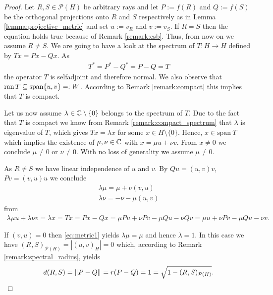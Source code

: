 \begin{proof}
	Let $R,S \in\mathcal{P}(H)$ be arbitrary rays and let $P := f(R)$ and $Q:= f(S)$ be the orthogonal projections onto $R$ and $S$ respectively as in Lemma \ref{lemma:projective_metric} and set $u := v_R$ and $v := v_S$. If $R = S$ then the equation holds true because of Remark \ref{remark:csb}. Thus, from now on we assume $R \neq S$. We are going to have a look at the spectrum of $T: H \to H$ defined by $Tx = Px - Qx$. As
	\begin{align*}
		T^\ast = P^\ast - Q^\ast = P - Q = T
	\end{align*}
	the operator $T$ is selfadjoint and therefore normal. We also observe that $\operatorname{ran} T \subseteq \mathrm{span}\{u, v\} =: W$. According to Remark \ref{remark:compact} this implies that $T$ is compact.
	
	Let us now assume $\lambda \in \mathbb{C} \setminus \{0\}$ belongs to the spectrum of $T$. Due to the fact that $T$ is compact we know from Remark \ref{remark:compact_spectrum} that $\lambda$ is eigenvalue of $T$, which gives $T x = \lambda x$ for some $x \in H \setminus \{0\}$. Hence, $x \in \mathrm{span 
	}\ T$ which implies the existence of $\mu, \nu \in \mathbb{C}$ with $x = \mu u + \nu v$. From $x \neq 0$ we conclude $\mu \neq 0$ or $\nu \neq 0$. With no loss of generality we assume $\mu \neq 0$.
	
	As $R \neq S$ we have linear independence of $u$ and $v$. By $Qu = (u,v) v$, $Pv = (v,u) u$ we conclude
	\begin{align}
		\lambda \mu  = \mu  + \nu (v,u) \label{eq:metric1}\\
		 \lambda \nu  = - \nu  - \mu (u,v) \label{eq:metric2}
	\end{align}
	from
	\begin{align*}
		\lambda \mu u + \lambda \nu v = \lambda x = Tx = Px - Qx = \mu Pu + \nu Pv - \mu Qu - \nu Qv = \mu u + \nu Pv - \mu Qu - \nu v .
	\end{align*}
	
	If $(v,u) = 0$ then \eqref{eq:metric1} yields $\lambda \mu = \mu$ and hence $\lambda = 1$. In this case we have $(R,S)_{\mathcal{P}(H)} = |(u,v)_H| = 0$ which, according to Remark \ref{remark:spectral_radius}, yields 
	\begin{align*}
		d(R,S) = {\left \| P - Q \right \|}_{} = r(P - Q) = 1 = \sqrt{1 - (R,S)_{\mathcal{P}(H)}}.
	\end{align*}
	

\end{proof}
